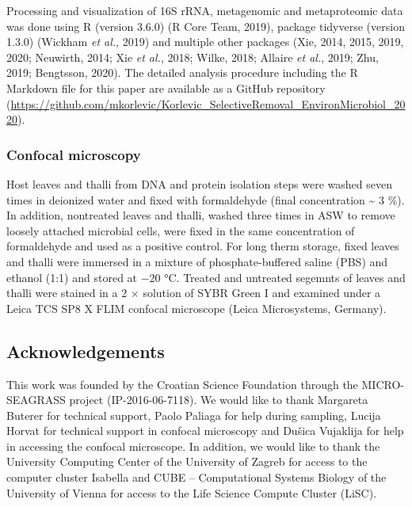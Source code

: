 \documentclass[
  12pt,
]{article}
\begin{document}
Processing and visualization of 16S rRNA, metagenomic and metaproteomic
data was done using R (version 3.6.0) (R Core Team, 2019), package
tidyverse (version 1.3.0) (Wickham \emph{et al.}, 2019) and multiple
other packages (Xie, 2014, 2015, 2019, 2020; Neuwirth, 2014; Xie
\emph{et al.}, 2018; Wilke, 2018; Allaire \emph{et al.}, 2019; Zhu,
2019; Bengtsson, 2020). The detailed analysis procedure including the R
Markdown file for this paper are available as a GitHub repository
(\url{https://github.com/mkorlevic/Korlevic_SelectiveRemoval_EnvironMicrobiol_2020}).

\hypertarget{confocal-microscopy}{%
\subsubsection{Confocal microscopy}\label{confocal-microscopy}}

Host leaves and thalli from DNA and protein isolation steps were washed
seven times in deionized water and fixed with formaldehyde (final
concentration \textasciitilde{} 3 \si{\percent}). In addition,
nontreated leaves and thalli, washed three times in ASW to remove
loosely attached microbial cells, were fixed in the same concentration
of formaldehyde and used as a positive control. For long therm storage,
fixed leaves and thalli were immersed in a mixture of phosphate-buffered
saline (PBS) and ethanol (1:1) and stored at \num{-20}
\si{\degreeCelsius}. Treated and untreated segemnts of leaves and thalli
were stained in a 2 × solution of SYBR Green I and examined under a
Leica TCS SP8 X FLIM confocal microscope (Leica Microsystems, Germany).

\hypertarget{acknowledgements}{%
\subsection{Acknowledgements}\label{acknowledgements}}

This work was founded by the Croatian Science Foundation through the
MICRO-SEAGRASS project (IP-2016-06-7118). We would like to thank
Margareta Buterer for technical support, Paolo Paliaga for help during
sampling, Lucija Horvat for technical support in confocal microscopy and
Dušica Vujaklija for help in accessing the confocal microscope. In
addition, we would like to thank the University Computing Center of the
University of Zagreb for access to the computer cluster Isabella and
CUBE -- Computational Systems Biology of the University of Vienna for
access to the Life Science Compute Cluster (LiSC).
\end{document}
